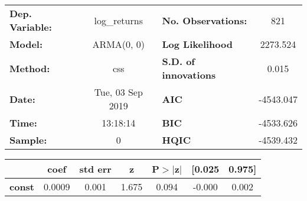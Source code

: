 \begin{center}
\begin{tabular}{lclc}
\toprule
\textbf{Dep. Variable:} &   log\_returns   & \textbf{  No. Observations:  } &    821      \\
\textbf{Model:}         &    ARMA(0, 0)    & \textbf{  Log Likelihood     } &  2273.524   \\
\textbf{Method:}        &       css        & \textbf{  S.D. of innovations} &   0.015     \\
\textbf{Date:}          & Tue, 03 Sep 2019 & \textbf{  AIC                } & -4543.047   \\
\textbf{Time:}          &     13:18:14     & \textbf{  BIC                } & -4533.626   \\
\textbf{Sample:}        &        0         & \textbf{  HQIC               } & -4539.432   \\
\bottomrule
\end{tabular}
\begin{tabular}{lcccccc}
               & \textbf{coef} & \textbf{std err} & \textbf{z} & \textbf{P$> |$z$|$} & \textbf{[0.025} & \textbf{0.975]}  \\
\midrule
\textbf{const} &       0.0009  &        0.001     &     1.675  &         0.094        &       -0.000    &        0.002     \\
\bottomrule
\end{tabular}
\end{center}
